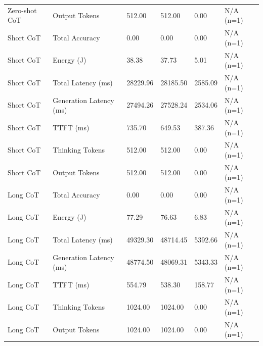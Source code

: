 \begin{table}
\begin{tabular}{llllll}
Zero-shot CoT & Output Tokens & 512.00 & 512.00 & 0.00 & N/A (n=1) \\
Short CoT & Total Accuracy & 0.00 & 0.00 & 0.00 & N/A (n=1) \\
Short CoT & Energy (J) & 38.38 & 37.73 & 5.01 & N/A (n=1) \\
Short CoT & Total Latency (ms) & 28229.96 & 28185.50 & 2585.09 & N/A (n=1) \\
Short CoT & Generation Latency (ms) & 27494.26 & 27528.24 & 2534.06 & N/A (n=1) \\
Short CoT & TTFT (ms) & 735.70 & 649.53 & 387.36 & N/A (n=1) \\
Short CoT & Thinking Tokens & 512.00 & 512.00 & 0.00 & N/A (n=1) \\
Short CoT & Output Tokens & 512.00 & 512.00 & 0.00 & N/A (n=1) \\
Long CoT & Total Accuracy & 0.00 & 0.00 & 0.00 & N/A (n=1) \\
Long CoT & Energy (J) & 77.29 & 76.63 & 6.83 & N/A (n=1) \\
Long CoT & Total Latency (ms) & 49329.30 & 48714.45 & 5392.66 & N/A (n=1) \\
Long CoT & Generation Latency (ms) & 48774.50 & 48069.31 & 5343.33 & N/A (n=1) \\
Long CoT & TTFT (ms) & 554.79 & 538.30 & 158.77 & N/A (n=1) \\
Long CoT & Thinking Tokens & 1024.00 & 1024.00 & 0.00 & N/A (n=1) \\
Long CoT & Output Tokens & 1024.00 & 1024.00 & 0.00 & N/A (n=1) \\
\bottomrule
\end{tabular}
\end{table}
